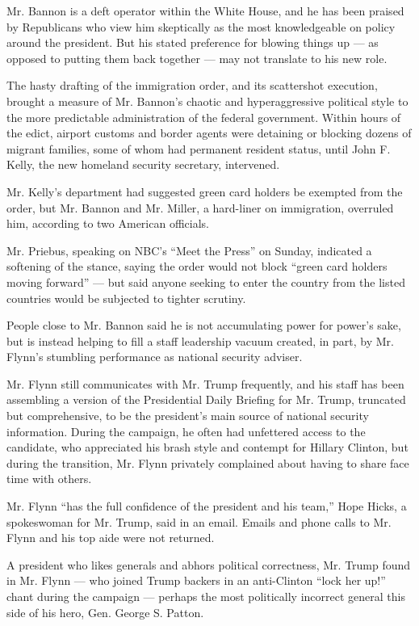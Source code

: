 Mr. Bannon is a deft operator within the White House, and he has been
praised by Republicans who view him skeptically as the most
knowledgeable on policy around the president. But his stated preference
for blowing things up --- as opposed to putting them back together ---
may not translate to his new role.

The hasty drafting of the immigration order, and its scattershot
execution, brought a measure of Mr. Bannon's chaotic and hyperaggressive
political style to the more predictable administration of the federal
government. Within hours of the edict, airport customs and border agents
were detaining or blocking dozens of migrant families, some of whom had
permanent resident status, until John F. Kelly, the new homeland
security secretary, intervened.

Mr. Kelly's department had suggested green card holders be exempted from
the order, but Mr. Bannon and Mr. Miller, a hard-liner on immigration,
overruled him, according to two American officials.

Mr. Priebus, speaking on NBC's ``Meet the Press'' on Sunday, indicated a
softening of the stance, saying the order would not block ``green card
holders moving forward'' --- but said anyone seeking to enter the
country from the listed countries would be subjected to tighter
scrutiny.

People close to Mr. Bannon said he is not accumulating power for power's
sake, but is instead helping to fill a staff leadership vacuum created,
in part, by Mr. Flynn's stumbling performance as national security
adviser.

Mr. Flynn still communicates with Mr. Trump frequently, and his staff
has been assembling a version of the Presidential Daily Briefing for Mr.
Trump, truncated but comprehensive, to be the president's main source of
national security information. During the campaign, he often had
unfettered access to the candidate, who appreciated his brash style and
contempt for Hillary Clinton, but during the transition, Mr. Flynn
privately complained about having to share face time with others.

Mr. Flynn ``has the full confidence of the president and his team,''
Hope Hicks, a spokeswoman for Mr. Trump, said in an email. Emails and
phone calls to Mr. Flynn and his top aide were not returned.

A president who likes generals and abhors political correctness, Mr.
Trump found in Mr. Flynn --- who joined Trump backers in an anti-Clinton
``lock her up!'' chant during the campaign --- perhaps the most
politically incorrect general this side of his hero, Gen. George S.
Patton.

